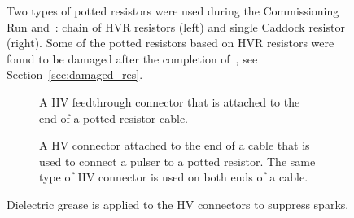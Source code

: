 \begin{figure}[]
	\centering
	\caption{Two types of potted resistors were used during the Commissioning Run and~\runone: chain of HVR resistors (left) and single Caddock resistor (right). Some of the potted resistors based on HVR resistors were found to be damaged after the completion of~\runone, see Section~\ref{sec:damaged_res}.}\label{fig:potted_resistors}
\end{figure}

\begin{figure}[]
	\centering
	\begin{subfigure}{\columnwidth}
		\caption{A HV feedthrough connector that is attached to the end of a potted resistor cable.}\label{fig:hv_feedthrough_conn}
	\end{subfigure}
	\begin{subfigure}{\columnwidth}
		\caption{A HV connector attached to the end of a cable that is used to connect a pulser to a potted resistor. The same type of HV connector is used on both ends of a cable.}\label{fig:hv_cable_conn}
	\end{subfigure}
	\caption{Dielectric grease is applied to the HV connectors to suppress sparks.}\label{fig:hv_conn}
\end{figure}

